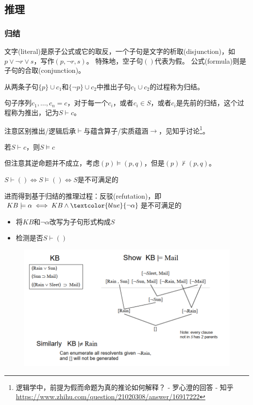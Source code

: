 \subsection{推理}
\subsubsection{归结}
\begin{definition}[子句(clause)]
文字(literal)是原子公式或它的取反，一个子句是文字的析取(disjunction)，如$p\lor\lnot r\lor s$，写作$(p,\lnot r,s)$。
特殊地，空子句$()$代表为假。
公式(formula)则是子句的合取(conjunction)。
\end{definition}

\begin{definition}[归结(resolution)]
从两条子句$\{p\}\cup c_1$和$\{\lnot p\}\cup c_2$中推出子句$c_1\cup c_2$的过程称为归结。
\end{definition}
\begin{definition}[推出(derivation)]
句子序列$c_1,\ldots,c_n=c$，对于每一个$c_i$，或者$c_i\in S$，或者$c_i$是先前的归结，这个过程称为推出，记为$S\vdash c$。
\end{definition}
注意区别推出/逻辑后承$\vdash$与蕴含算子/实质蕴涵$\to$，见知乎讨论\footnote{逻辑学中，前提为假而命题为真的推论如何解释？ - 罗心澄的回答 - 知乎 \url{https://www.zhihu.com/question/21020308/answer/16917222}}。

\begin{theorem}
若$S\vdash c$，则$S\models c$
\end{theorem}
但注意其逆命题并不成立，考虑$(p)\models(p,q)$，但是$(p)\not\vdash(p,q)$。

\begin{theorem}
$S\vdash()\iff S\models()\iff S$是不可满足的
\end{theorem}

进而得到基于归结的推理过程：反驳(refutation)，即$KB\models\alpha\iff KB\land\textcolor{blue}{\lnot\alpha}$是不可满足的
\begin{itemize}
	\item 将$KB$和$\lnot\alpha$改写为子句形式构成$S$
	\item 检测是否$S\vdash()$
\end{itemize}
\begin{figure}[H]
\centering
\includegraphics[width=0.8\linewidth]{fig/refutation.png}
\end{figure}

